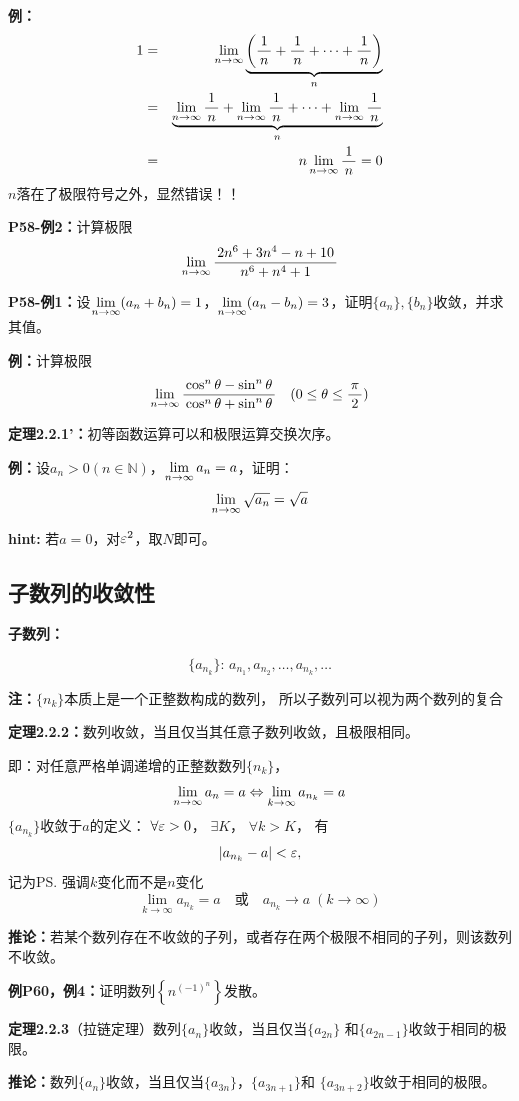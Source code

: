 {\bf 例：}
\begin{eqnarray*}
	1&=&\lim\limits_{n\to\infty} \underbrace{\left(\displaystyle\frac{\,{1}\,}{\,{n}\,}+\displaystyle\frac{\,{1}\,}{\,{n}\,}+\cdots+\displaystyle\frac{\,{1}\,}{\,{n}\,}\right)}_{n}\\
	&=&\underbrace{\lim\limits_{n\to\infty}\displaystyle\frac{\,{1}\,}{\,{n}\,}+\lim\limits_{n\to\infty}\displaystyle\frac{\,{1}\,}{\,{n}\,}+\cdots+\lim\limits_{n\to\infty}\displaystyle\frac{\,{1}\,}{\,{n}\,}}_{n}\\
	&=&n\lim\limits_{n\to\infty}\displaystyle\frac{\,{1}\,}{\,{n}\,}=0
\end{eqnarray*}
$n$落在了极限符号之外，显然错误！！

{\bf P58-例2：}计算极限
$$\lim\limits_{n\to\infty}\displaystyle\frac{\,{2n^6+3n^4-n+10}\,}{\,{n^6+n^4+1}\,}$$

{\bf P58-例1：}设$\lim\limits_{n\to\infty}(a_n+b_n)=1$，$\lim\limits_{n\to\infty}(a_n-b_n)=3$，证明$\{a_n\},\{b_n\}$收敛，并求其值。

{\bf 例：}计算极限
$$\lim\limits_{n\to\infty}\displaystyle\frac{\,{\cos^n\theta-\sin^n\theta}\,}{\,{\cos^n\theta+\sin^n\theta}\,}\quad
(0\leq\theta\leq\displaystyle\frac{\,{\pi}\,}{\,{2}\,})$$

{\bf 定理2.2.1'：}初等函数运算可以和极限运算交换次序。

{\bf 例：}设$a_n>0(n\in\mathbb{N})$，$\lim\limits_{n\to\infty} a_n=a$，证明：
$$\lim\limits_{n\to\infty}\sqrt{a_n}=\sqrt a$$

{\bf hint:} 若$a=0$，对$\varepsilon^2$，取$N$即可。

\subsection{子数列的收敛性}

{\bf 子数列：}

$$\{a_{n_k}\}:\,a_{n_1},a_{n_2},\ldots,a_{n_k},\ldots$$

{\bf 注：}$\{n_k\}$本质上是一个正整数构成的数列，
所以子数列可以视为两个数列的复合

{\bf 定理2.2.2：}数列收敛，当且仅当其任意子数列收敛，且极限相同。

即：对任意严格单调递增的正整数数列$\{n_k\}$，
$$\lim\limits_{n\to\infty} a_n=a\Leftrightarrow\lim_{k\to\infty}a_{n_k}=a$$
$\{a_{n_k}\}$收敛于$a$的定义： $\forall \varepsilon>0$， $\exists
{K}$， $\forall {k>K}$， 有 $$|a_{{{n_k}}}-a|<\varepsilon,$$
 记为\ps{强调$k$变化而不是$n$变化}
$$\lim\limits_{{k\to\infty}}a_{n_k}=a\quad \mbox{或}\quad a_{n_k}\to
a\;{(k\to\infty)}$$


{\bf 推论：}若某个数列存在不收敛的子列，或者存在两个极限不相同的子列，则该数列不收敛。

{\bf 例P60，例4：}证明数列$\left\{n^{(-1)^n}\right\}$发散。

{\bf 定理2.2.3}（拉链定理）数列$\{a_n\}$收敛，当且仅当$\{a_{2n}\}$
和$\{a_{2n-1}\}$收敛于相同的极限。

{\bf 推论：}数列$\{a_n\}$收敛，当且仅当$\{a_{3n}\}$，$\{a_{3n+1}\}$和
$\{a_{3n+2}\}$收敛于相同的极限。

